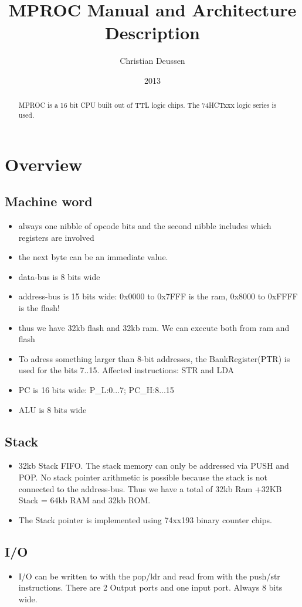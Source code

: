 \documentclass[a4paper, 12pt]{article}
\title{MPROC Manual and Architecture Description}
\author{Christian Deussen}
\date{2013}
\begin{document}
	\maketitle
	\begin{abstract}
		MPROC is a 16 bit CPU built out of TTL logic chips. The 74HCTxxx logic series is used.
	\end{abstract}
	\tableofcontents
	\newpage
		\section{Overview}
	\subsection {Machine word}
	\begin{itemize}
		\item always one nibble of opcode bits and the second nibble includes which registers are involved
		\item the next byte can be an immediate value.
		\item data-bus is 8 bits wide
		\item address-bus is 15 bits wide: 0x0000 to 0x7FFF is the ram, 0x8000 to 0xFFFF is the flash! 
		\item thus we have 32kb flash and 32kb ram. We can execute both from ram and flash
		\item To adress something larger than 8-bit addresses, the BankRegister(PTR) is used for the bits 7..15. Affected instructions: STR and LDA
		\item PC is 16 bits wide: P\_L:0...7; PC\_H:8...15
		\item ALU is 8 bits wide
	\end{itemize}

	\subsection {Stack}
	\begin{itemize}
		\item 32kb Stack FIFO. The stack memory can only be addressed via PUSH and POP. No stack pointer arithmetic is possible because the stack is not connected to the address-bus. Thus we have a total of 32kb Ram +32KB Stack = 64kb RAM and 32kb ROM.
		\item The Stack pointer is implemented using 74xx193 binary counter chips. 
	\end{itemize}

	\subsection{I/O}
	\begin{itemize}
		\item I/O can be written to with the pop/ldr and read from with the push/str instructions. There are 2 Output ports and one input port. Always 8 bits wide.
	\end{itemize}
\end{document}
